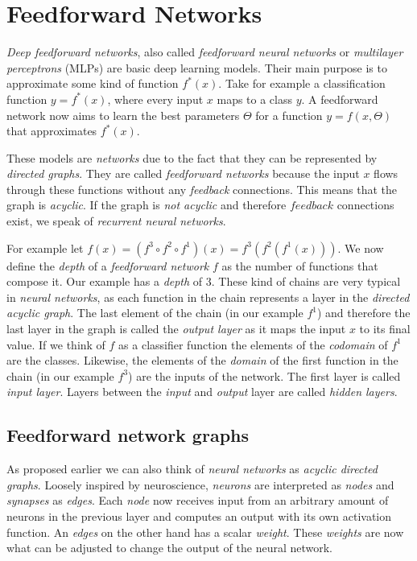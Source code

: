 \section{Feedforward Networks}
\label{sec:feedforward-networks}

\emph{Deep feedforward networks}, also called \emph{feedforward neural networks} or \emph{multilayer perceptrons} (MLPs) are basic deep learning models.
Their main purpose is to approximate some kind of function \(f^*(x)\).
Take for example a classification function \(y = f^*(x)\), where every input \(x\) maps to a class \(y\).
A feedforward network now aims to learn the best parameters \(\Theta\) for a function \(y = f(x, \Theta)\) that approximates \(f^*(x)\).

These models are \emph{networks} due to the fact that they can be represented by \emph{directed graphs}.
They are called \emph{feedforward networks} because the input \(x\) flows through these functions without any \emph{feedback} connections.
This means that the graph is \emph{acyclic}.
If the graph is \emph{not acyclic} and therefore \(feedback\) connections exist, we speak of \emph{recurrent neural networks}.

For example let \(f(x) = (f^3 \circ f^2 \circ f^1)(x) = f^3(f^2(f^1(x)))\).
We now define the \emph{depth} of a \emph{feedforward network} \(f\) as the number of functions that compose it.
Our example has a \emph{depth} of \(3\).
These kind of chains are very typical in \emph{neural networks}, as each function in the chain represents a layer in the \emph{directed acyclic graph}.
The last element of the chain (in our example \(f^1\)) and therefore the last layer in the graph is called the \emph{output layer} as it maps the input \(x\) to its final value.
If we think of \(f\) as a classifier function the elements of the \emph{codomain} of \(f^1\) are the classes.
Likewise, the elements of the \emph{domain} of the first function in the chain (in our example \(f^3\)) are the inputs of the network.
The first layer is called \emph{input layer}.
Layers between the \emph{input} and \emph{output} layer are called \emph{hidden layers}.

\subsection{Feedforward network graphs}
As proposed earlier we can also think of \emph{neural networks} as \emph{acyclic directed graphs}.
Loosely inspired by neuroscience, \emph{neurons} are interpreted as \emph{nodes} and \emph{synapses} as \emph{edges}.
Each \emph{node} now receives input from an arbitrary amount of neurons in the previous layer and computes an output with its own activation function.
An \emph{edges} on the other hand has a scalar \emph{weight}.
These \emph{weights} are now what can be adjusted to change the output of the neural network.

